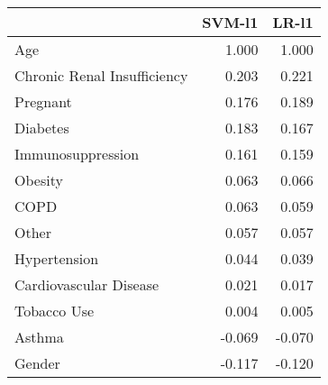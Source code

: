 \begin{tabular}{lrr}
\toprule
{} &  SVM-l1 &  LR-l1 \\
\midrule
Age                         &   1.000 &  1.000 \\
Chronic Renal Insufficiency &   0.203 &  0.221 \\
Pregnant                    &   0.176 &  0.189 \\
Diabetes                    &   0.183 &  0.167 \\
Immunosuppression           &   0.161 &  0.159 \\
Obesity                     &   0.063 &  0.066 \\
COPD                        &   0.063 &  0.059 \\
Other                       &   0.057 &  0.057 \\
Hypertension                &   0.044 &  0.039 \\
Cardiovascular Disease      &   0.021 &  0.017 \\
Tobacco Use                 &   0.004 &  0.005 \\
Asthma                      &  -0.069 & -0.070 \\
Gender                      &  -0.117 & -0.120 \\
\bottomrule
\end{tabular}
